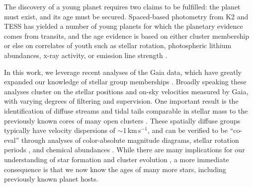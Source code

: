 \documentclass[12pt,twocolumn,linenumbers]{aastex63}
\newcommand{\kms}{\,km\,s$^{-1}$}
\begin{document}
The discovery of a young planet requires two claims to be fulfilled:
the planet must exist, and its age must be secured.  Spaced-based
photometry from K2 and TESS has yielded a number of young planets for
which the planetary evidence comes from transits, and the age evidence
is based on either cluster membership \citep[{\it
e.g.},]{Mann_et_al_2017,david_four_2019,newton_tess_2019,bouma_cluster_2020,nardiello_pathosII_2020}
or else on correlates of youth such as stellar rotation, photospheric
lithium abundances, x-ray activity, or emission line strength
\citep[{\it e.g.},]{zhou_2021_tois,hedges_toi-2076_2021}.

In this work, we leverage recent analyses of the Gaia data, which have
greatly expanded our knowledge of stellar group memberships
\citep[{\it e.g.},][]{CantatGaudin2018a,KounkelCovey2019,Kerr2021}.
Broadly speaking these analyses cluster on the stellar positions and
on-sky velocities measured by Gaia, with varying degrees of filtering
and supervision.  One important result is the identification of
diffuse streams and tidal tails comparable in stellar mass to the
previously known cores of many open clusters
\citep{meingast_psceri_2019,Meingast2021,gagne_number_2021}.  These
spatially diffuse groups typically have velocity dispersions of
$\sim$1\kms, and can be verified to be ``co-eval'' through analyses of
color-absolute magnitude diagrams, stellar rotation periods
\citep{curtis_tess_2019,bouma_2021_ngc2516}, and chemical abundances
\citep{hawkins_2020}.  While there are many implications for our
understanding of star formation and cluster evolution \citep[{\it
e.g.}][]{dinnbier_tidal_2020}, a more immediate consequence is that we
now know the ages of many more stars, including previously known
planet hosts.


\end{document}

